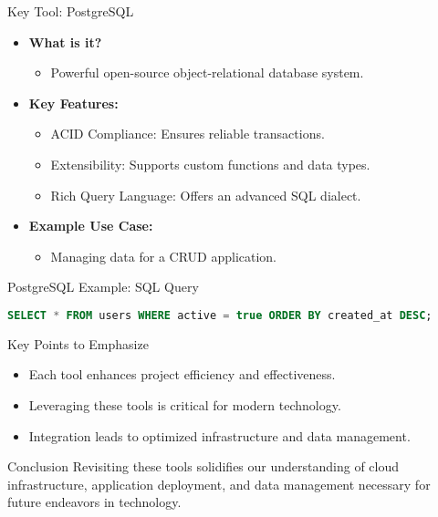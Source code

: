 \documentclass[aspectratio=169]{beamer}
\begin{document}
\begin{frame}{Key Tool: PostgreSQL}
  \begin{itemize}
    \item \textbf{What is it?} 
      \begin{itemize}
        \item Powerful open-source object-relational database system.
      \end{itemize}
    \item \textbf{Key Features:}
      \begin{itemize}
        \item ACID Compliance: Ensures reliable transactions.
        \item Extensibility: Supports custom functions and data types.
        \item Rich Query Language: Offers an advanced SQL dialect.
      \end{itemize}
    \item \textbf{Example Use Case:}
      \begin{itemize}
        \item Managing data for a CRUD application.
      \end{itemize}
  \end{itemize}
\end{frame}

\begin{frame}[fragile]{PostgreSQL Example: SQL Query}
  \begin{lstlisting}[language=sql]
SELECT * FROM users WHERE active = true ORDER BY created_at DESC;
  \end{lstlisting}
\end{frame}

\begin{frame}{Key Points to Emphasize}
  \begin{itemize}
    \item Each tool enhances project efficiency and effectiveness.
    \item Leveraging these tools is critical for modern technology.
    \item Integration leads to optimized infrastructure and data management.
  \end{itemize}
\end{frame}

\begin{frame}{Conclusion}
  Revisiting these tools solidifies our understanding of cloud infrastructure, application deployment, and data management necessary for future endeavors in technology.
\end{frame}
\end{document}
